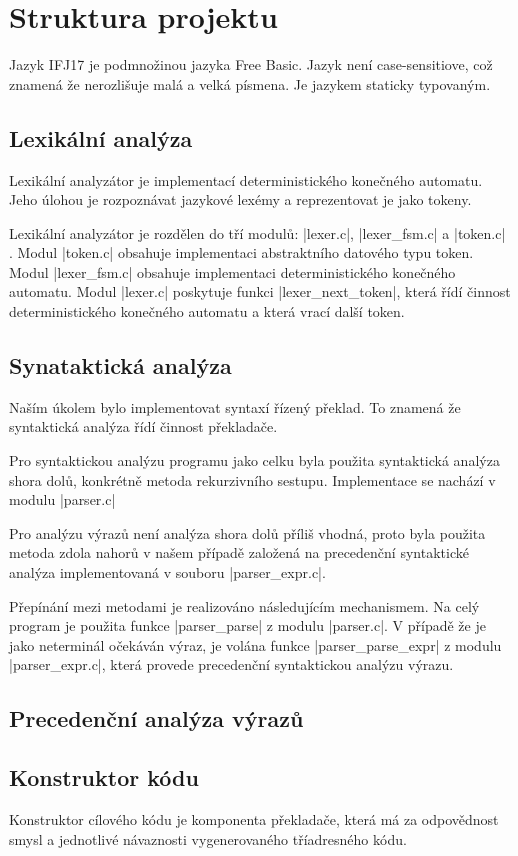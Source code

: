 \section{Struktura projektu}
Jazyk IFJ17 je podmnožinou jazyka Free Basic. Jazyk není case-sensitiove,
což znamená že nerozlišuje malá a velká písmena. Je jazykem staticky typovaným.
\subsection{Lexikální analýza}
Lexikální analyzátor je implementací deterministického konečného
automatu. Jeho úlohou je rozpoznávat jazykové lexémy a reprezentovat
je jako tokeny.

Lexikální analyzátor je rozdělen do tří modulů: \ic|lexer.c|, \ic|lexer_fsm.c| a \ic|token.c|
. Modul \ic|token.c| obsahuje implementaci abstraktního datového typu token. Modul \ic|lexer_fsm.c|
obsahuje implementaci deterministického konečného automatu. Modul \ic|lexer.c| poskytuje funkci
\ic|lexer_next_token|, která řídí činnost deterministického konečného automatu a
která vrací další token.

\subsection{Synataktická analýza}
Naším úkolem bylo implementovat syntaxí řízený překlad. To znamená
že syntaktická analýza řídí činnost překladače.

Pro syntaktickou analýzu programu jako celku byla použita syntaktická
analýza shora dolů, konkrétně metoda rekurzivního sestupu. Implementace se nachází v modulu \ic|parser.c|

Pro analýzu výrazů není analýza shora dolů příliš vhodná, proto byla
použita metoda zdola nahorů v našem případě založená na precedenční
syntaktické analýza implementovaná v souboru \ic|parser_expr.c|.

Přepínání mezi metodami je realizováno následujícím mechanismem. Na celý program je použita funkce \ic|parser_parse|
z modulu \ic|parser.c|. V případě že je jako neterminál očekáván výraz, je volána funkce \ic|parser_parse_expr|
z modulu \ic|parser_expr.c|, která provede precedenční syntaktickou analýzu výrazu.

\subsection{Precedenční analýza výrazů}
\subsection{Konstruktor kódu}
Konstruktor cílového kódu je komponenta překladače, která má za odpovědnost smysl a jednotlivé návaznosti vygenerovaného tříadresného kódu.

